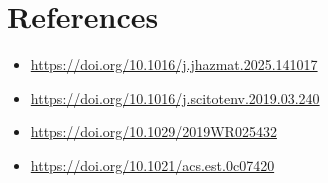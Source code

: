 \documentclass{article}
\begin{document}
\begin{itemize}
\end{itemize}

\section{References}
\begin{itemize}
  \item \url{https://doi.org/10.1016/j.jhazmat.2025.141017}
  \item \url{https://doi.org/10.1016/j.scitotenv.2019.03.240}
  \item \url{https://doi.org/10.1029/2019WR025432}
  \item \url{https://doi.org/10.1021/acs.est.0c07420}
\end{itemize}
\end{document}

